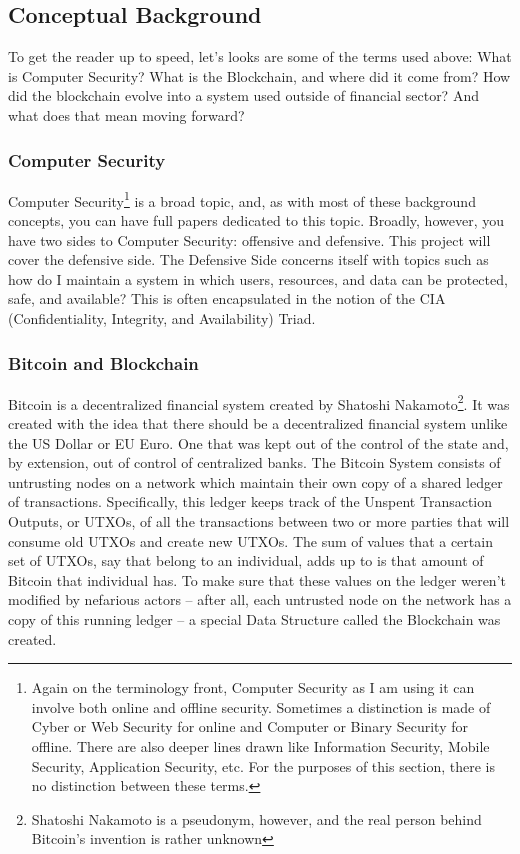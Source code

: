 	\subsection{Conceptual Background}
		\hspace{10mm}To get the reader up to speed, let's looks are some of the terms used above: What is Computer Security? What is the Blockchain, and where did it come from? How did the blockchain evolve into a system used outside of financial sector? And what does that mean moving forward?
		
		\subsubsection{Computer Security}
			\hspace{10mm}Computer Security\footnote{Again on the terminology front, Computer Security as I am using it can involve both online and offline security. Sometimes a distinction is made of Cyber or Web Security for online and Computer or Binary Security for offline. There are also deeper lines drawn like Information Security, Mobile Security, Application Security, etc. For the purposes of this section, there is no distinction between these terms.} is a broad topic, and, as with most of these background concepts, you can have full papers dedicated to this topic. Broadly, however, you have two sides to Computer Security: offensive and defensive. This project will cover the defensive side. The Defensive Side concerns itself with topics such as how do I maintain a system in which users, resources, and data can be protected, safe, and available? This is often encapsulated in the notion of the CIA (Confidentiality, Integrity, and Availability) Triad.\\
			
		\subsubsection{Bitcoin and Blockchain}
			\hspace{10mm}Bitcoin is a decentralized financial system created by Shatoshi Nakamoto\footnote{Shatoshi Nakamoto is a pseudonym, however, and the real person behind Bitcoin's invention is rather unknown}. It was created with the idea that there should be a decentralized financial system unlike the US Dollar or EU Euro. One that was kept out of the control of the state and, by extension, out of control of centralized banks. The Bitcoin System consists of untrusting nodes on a network which maintain their own copy of a shared ledger of transactions. Specifically, this ledger keeps track of the Unspent Transaction Outputs, or UTXOs, of all the transactions between two or more parties that will consume old UTXOs and create new UTXOs. The sum of values that a certain set of UTXOs, say that belong to an individual, adds up to is that amount of Bitcoin that individual has. To make sure that these values on the ledger weren't modified by nefarious actors -- after all, each untrusted node on the network has a copy of this running ledger -- a special Data Structure called the Blockchain was created.\\
			
